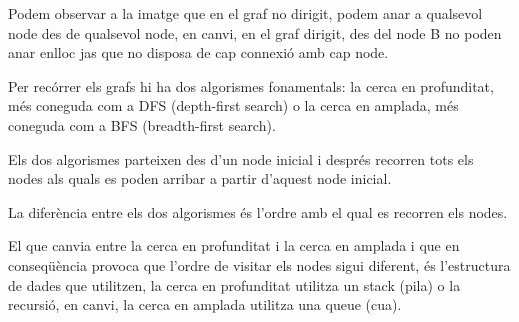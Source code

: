 Podem observar a la imatge que en el graf no dirigit, podem anar a qualsevol node des de qualsevol node, en canvi, en el graf dirigit, des del node B no poden anar enlloc jas que no disposa de cap connexió amb cap node. \newline

Per recórrer els grafs hi ha dos algorismes fonamentals: la cerca en profunditat, més coneguda com a DFS (depth-first search) o la cerca en amplada, més coneguda com a BFS (breadth-first search).

Els dos algorismes parteixen des d'un node inicial i després recorren tots els nodes als quals es poden arribar a partir d'aquest node inicial.

La diferència entre els dos algorismes és l'ordre amb el qual es recorren els nodes.

El que canvia entre la cerca en profunditat i la cerca en amplada i que en conseqüència provoca que l'ordre de visitar els nodes sigui diferent, és l'estructura de dades que utilitzen, la cerca en profunditat utilitza un stack (pila) o la recursió, en canvi, la cerca en amplada utilitza una queue (cua).


